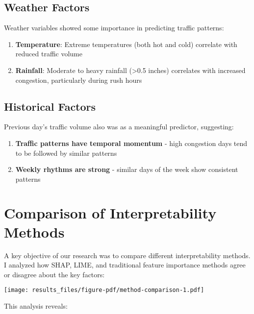 \documentclass[
  letterpaper,
  DIV=11,
  numbers=noendperiod]{scrreprt}
\providecommand{\tightlist}{%
  \setlength{\itemsep}{0pt}\setlength{\parskip}{0pt}}\usepackage{longtable,booktabs,array}
\begin{document}
\subsection{Weather Factors}\label{weather-factors}

Weather variables showed some importance in predicting traffic patterns:

\begin{enumerate}
\def\labelenumi{\arabic{enumi}.}
\tightlist
\item
  \textbf{Temperature}: Extreme temperatures (both hot and cold)
  correlate with reduced traffic volume
\item
  \textbf{Rainfall}: Moderate to heavy rainfall (\textgreater0.5 inches)
  correlates with increased congestion, particularly during rush hours
\end{enumerate}

\subsection{Historical Factors}\label{historical-factors}

Previous day's traffic volume also was as a meaningful predictor,
suggesting:

\begin{enumerate}
\def\labelenumi{\arabic{enumi}.}
\tightlist
\item
  \textbf{Traffic patterns have temporal momentum} - high congestion
  days tend to be followed by similar patterns
\item
  \textbf{Weekly rhythms are strong} - similar days of the week show
  consistent patterns
\end{enumerate}

\section{Comparison of Interpretability
Methods}\label{comparison-of-interpretability-methods}

A key objective of our research was to compare different
interpretability methods. I analyzed how SHAP, LIME, and traditional
feature importance methods agree or disagree about the key factors:

\texttt{[image: results\_files/figure-pdf/method-comparison-1.pdf]}

This analysis reveals:
\end{document}
